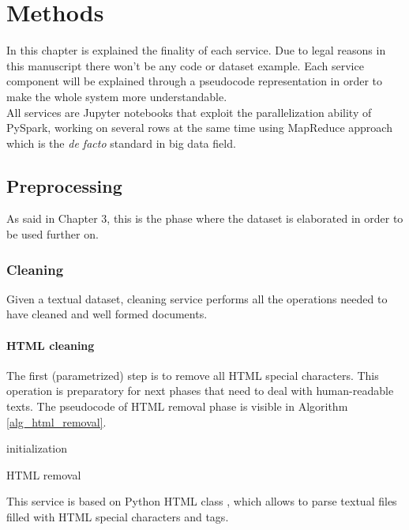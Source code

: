 \documentclass[\main/main.tex]{subfiles}
\begin{document}
\chapter{Methods}
\label{methods}
In this chapter is explained the finality of each service. Due to legal reasons in this manuscript there won't be any code or dataset example. Each service component will be explained through a pseudocode representation in order to make the whole system more understandable.\\
All services are Jupyter notebooks that exploit the parallelization ability of PySpark, working on several rows at the same time using MapReduce approach which is the \emph{de facto} standard in big data field.
\section{Preprocessing}
As said in Chapter 3, this is the phase where the dataset is elaborated in order to be used further on. 
\subsection{Cleaning}
Given a textual dataset, cleaning service performs all the operations needed to have cleaned and well formed documents.
\subsubsection{HTML cleaning}
The first (parametrized) step is to remove all HTML special characters. This operation is preparatory for next phases that need to deal with human-readable texts. The pseudocode of HTML removal phase is visible in Algorithm \ref{alg_html_removal}.
\begin{center}
    \begin{algorithm}[ht]
     initialization \\
     \caption{HTML removal}
     \label{alg_html_removal}
    \end{algorithm}
\end{center}
This service is based on Python HTML class \cite{html_parser}, which allows to parse textual files filled with HTML special characters and tags.
\end{document}
